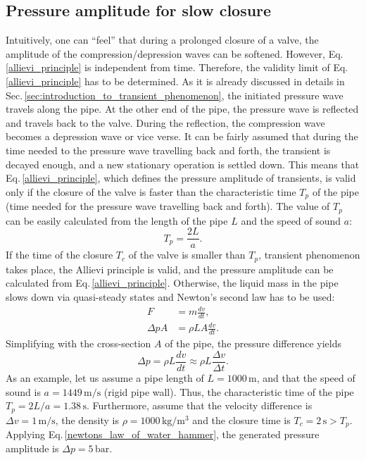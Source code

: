 \subsection{Pressure amplitude for slow closure} \label{sec:pressure_amplitude_slow_closure}
Intuitively, one can ``feel'' that during a prolonged closure of a valve, the amplitude of the compression/depression waves can be softened. However, Eq.\,\eqref{allievi_principle} is independent from time. Therefore, the validity limit of Eq.\,\eqref{allievi_principle} has to be determined. As it is already discussed in details in Sec.\,\ref{sec:introduction_to_transient_phenomenon}, the initiated pressure wave travels along the pipe. At the other end of the pipe, the pressure wave is reflected and travels back to the valve. During the reflection, the compression wave becomes a depression wave or vice verse. It can be fairly assumed that during the time needed to the pressure wave travelling back and forth, the transient is decayed enough, and a new stationary operation is settled down. This means that Eq.\,\eqref{allievi_principle}, which defines the pressure amplitude of transients, is valid only if the closure of the valve is faster than the characteristic time $T_p$ of the pipe (time needed for the pressure wave travelling back and forth). The value of $T_p$ can be easily calculated from the length of the pipe $L$ and the speed of sound $a$:
%
\begin{equation}
T_p = \frac{2 L}{a}.
\end{equation}
%
If the time of the closure $T_c$ of the valve is smaller than $T_p$, transient phenomenon takes place, the Allievi principle is valid, and the pressure amplitude can be calculated from Eq.\,\eqref{allievi_principle}. Otherwise, the liquid mass in the pipe slows down via quasi-steady states and Newton's second law has to be used:
%
\begin{align}
F &= m \frac{dv}{dt}, \\
\Delta p A &= \rho L A \frac{dv}{dt}.
\end{align}
%
Simplifying with the cross-section $A$ of the pipe, the pressure difference yields
%
\begin{equation} \label{newtons_law_of_water_hammer}
\Delta p = \rho L \frac{dv}{dt} \approx \rho L \frac{\Delta v}{\Delta t}.
\end{equation}
%
As an example, let us assume a pipe length of $L=1000\,\mathrm{m}$, and that the speed of sound is $a=1449\,\mathrm{m/s}$ (rigid pipe wall). Thus, the characteristic time of the pipe $T_p=2L/a=1.38\,\mathrm{s}$. Furthermore, assume that the velocity difference is $\Delta v=1\,\mathrm{m/s}$, the density is $\rho=1000\,\mathrm{kg/m^3}$ and the closure time is $T_c=2\,\mathrm{s}>T_p$. Applying Eq.\,\eqref{newtons_law_of_water_hammer}, the generated pressure amplitude is $\Delta p=5\,\mathrm{bar}$.

